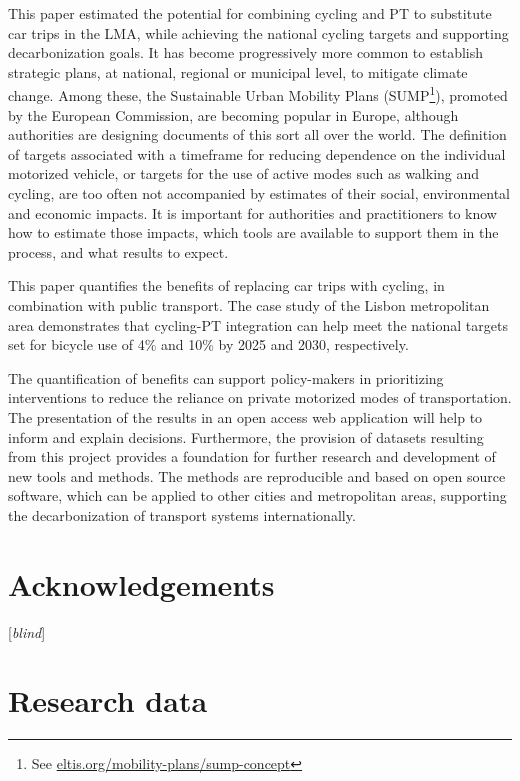 \documentclass[review, doubleblind, 3p,
authoryear]{elsarticle} %
\begin{document}
This paper estimated the potential for combining cycling and PT to
substitute car trips in the LMA, while achieving the national cycling
targets and supporting decarbonization goals. It has become
progressively more common to establish strategic plans, at national,
regional or municipal level, to mitigate climate change. Among these,
the Sustainable Urban Mobility Plans (SUMP\footnote{See
  \href{https://www.eltis.org/mobility-plans/sump-concept}{eltis.org/mobility-plans/sump-concept}}),
promoted by the European Commission, are becoming popular in Europe,
although authorities are designing documents of this sort all over the
world. The definition of targets associated with a timeframe for
reducing dependence on the individual motorized vehicle, or targets for
the use of active modes such as walking and cycling, are too often not
accompanied by estimates of their social, environmental and economic
impacts. It is important for authorities and practitioners to know how
to estimate those impacts, which tools are available to support them in
the process, and what results to expect.

This paper quantifies the benefits of replacing car trips with cycling,
in combination with public transport. The case study of the Lisbon
metropolitan area demonstrates that cycling-PT integration can help meet
the national targets set for bicycle use of 4\% and 10\% by 2025 and
2030, respectively.

The quantification of benefits can support policy-makers in prioritizing
interventions to reduce the reliance on private motorized modes of
transportation. The presentation of the results in an open access web
application will help to inform and explain decisions. Furthermore, the
provision of datasets resulting from this project provides a foundation
for further research and development of new tools and methods. The
methods are reproducible and based on open source software, which can be
applied to other cities and metropolitan areas, supporting the
decarbonization of transport systems internationally.

\hypertarget{acknowledgements}{%
\section*{Acknowledgements}\label{acknowledgements}}

{[}\emph{blind}{]}

\hypertarget{research-data}{%
\section*{Research data}\label{research-data}}
\end{document}
